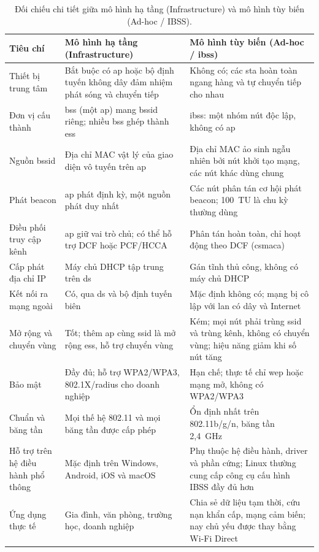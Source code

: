 \begin{table}[htbp]
  \centering\footnotesize
  \caption{Đối chiếu chi tiết giữa mô hình hạ tầng (Infrastructure) và mô hình
  tùy biến (Ad-hoc / IBSS).}
  \label{tab:infra-adhoc-detail}
  \begin{tabularx}{\linewidth}{@{} L{0.75} L{1.15} L{1.1} @{}}
    \toprule
    \textbf{Tiêu chí} & \textbf{Mô hình hạ tầng (Infrastructure)} & \textbf{Mô hình tùy biến (Ad-hoc / \ac{ibss})} \\
    \midrule
    Thiết bị trung tâm & Bắt buộc có \ac{ap} hoặc bộ định tuyến không dây đảm
      nhiệm phát sóng và chuyển tiếp & Không có; các \ac{sta} hoàn toàn ngang
      hàng và tự chuyển tiếp cho nhau \\
    Đơn vị cấu thành & \ac{bss} (một \ac{ap}) mang \ac{bssid} riêng; nhiều
      \ac{bss} ghép thành \ac{ess} & \ac{ibss}: một nhóm nút độc lập, không có
      \ac{ap} \\
    Nguồn \ac{bssid} & Địa chỉ MAC vật lý của giao diện vô tuyến trên \ac{ap} &
      Địa chỉ MAC ảo sinh ngẫu nhiên bởi nút khởi tạo mạng, các nút khác dùng
      chung \\
    Phát beacon & \ac{ap} phát định kỳ, một nguồn phát duy nhất & Các nút phân
      tán cơ hội phát beacon; 100~TU là chu kỳ thường dùng \\
    Điều phối truy cập kênh & \ac{ap} giữ vai trò chủ; có thể hỗ trợ DCF hoặc
      PCF/HCCA & Phân tán hoàn toàn, chỉ hoạt động theo DCF (\ac{csmaca}) \\
    Cấp phát địa chỉ IP & Máy chủ DHCP tập trung trên \ac{ds} & Gán tĩnh thủ
      công, không có máy chủ DHCP \\
    Kết nối ra mạng ngoài & Có, qua \ac{ds} và bộ định tuyến biên & Mặc định
      không có; mạng bị cô lập với \ac{lan} có dây và Internet \\
    Mở rộng và chuyển vùng & Tốt; thêm \ac{ap} cùng \ac{ssid} là mở rộng
      \ac{ess}, hỗ trợ chuyển vùng & Kém; mọi nút phải trùng \ac{ssid} và trùng
      kênh, không có chuyển vùng; hiệu năng giảm khi số nút tăng \\
    Bảo mật & Đầy đủ; hỗ trợ WPA2/WPA3, 802.1X/\ac{radius} cho doanh nghiệp &
      Hạn chế; thực tế chỉ \ac{wep} hoặc mạng mở, không có WPA2/WPA3 \\
    Chuẩn và băng tần & Mọi thế hệ 802.11 và mọi băng tần được cấp phép & Ổn
      định nhất trên 802.11b/g/n, băng tần 2,4~GHz \\
    Hỗ trợ trên hệ điều hành phổ thông & Mặc định trên Windows, Android, iOS và
      macOS & Phụ thuộc hệ điều hành, driver và phần cứng; Linux thường cung cấp
      công cụ cấu hình IBSS đầy đủ hơn \\
    Ứng dụng thực tế & Gia đình, văn phòng, trường học, doanh nghiệp & Chia sẻ
      dữ liệu tạm thời, cứu nạn khẩn cấp, mạng cảm biến; nay chủ yếu được thay
      bằng Wi-Fi Direct \\
    \bottomrule
  \end{tabularx}
\end{table}

